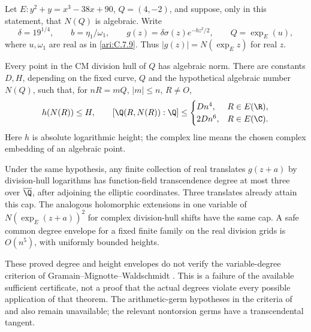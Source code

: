 \begin{proposition}\label{ari:C.7.12}
Let $E:y^2+y=x^3-38x+90$, $Q=(4,-2)$, and suppose, only in
this statement, that $N(Q)$ is algebraic.  Write
\[
 \delta=19^{1/4},\qquad b=\eta_1/\omega_1,\qquad
 g(z)=\delta\sigma(z)e^{-bz^2/2},\qquad Q=\exp_E(u),
\]
where $u,\omega_1$ are real as in \ref{ari:C.7.9}.  Thus
$|g(z)|=N(\exp_E z)$ for real $z$.

Every point in the CM division hull of $Q$ has algebraic norm.
There are constants $D,H$, depending on the fixed curve, $Q$ and
the hypothetical algebraic number $N(Q)$, such that, for
$nR=mQ$, $|m|\leq n$, $R\ne O$,
\[
 h(N(R))\leq H,
 \qquad
 [\Q(R,N(R)):\Q]\leq
 \begin{cases}Dn^4,&R\in E(\R),\\2Dn^6,&R\in E(\C).
 \end{cases}
\]
Here $h$ is absolute logarithmic height; the complex line means
the chosen complex embedding of an algebraic point.

Under the same hypothesis, any finite collection of real translates
$g(z+a)$ by division-hull logarithms has function-field
transcendence degree at most three over $\overline\Q$, after
adjoining the elliptic coordinates.  Three translates already
attain this cap.  The analogous holomorphic extensions in one
variable of $N(\exp_E(z+a))^2$ for complex division-hull shifts
have the same cap.  A safe common degree envelope for a fixed
finite family on the real division grids is $O(n^5)$, with
uniformly bounded heights.

These proved degree and height envelopes do not verify the
variable-degree criterion of Gramain--Mignotte--Waldschmidt
\citep[Theorem 2.1]{gramain1986values}.  This is a failure of the
available sufficient certificate, not a proof that the actual
degrees violate every possible application of that theorem.
The arithmetic-germ hypotheses in the criteria of
\citet[Theorem 6.1]{herblot2012meromorphic} and
\citet[Theorem 4.16]{gasbarri2010analytic} also remain unavailable;
the relevant nontorsion germs have a transcendental tangent.
\end{proposition}


